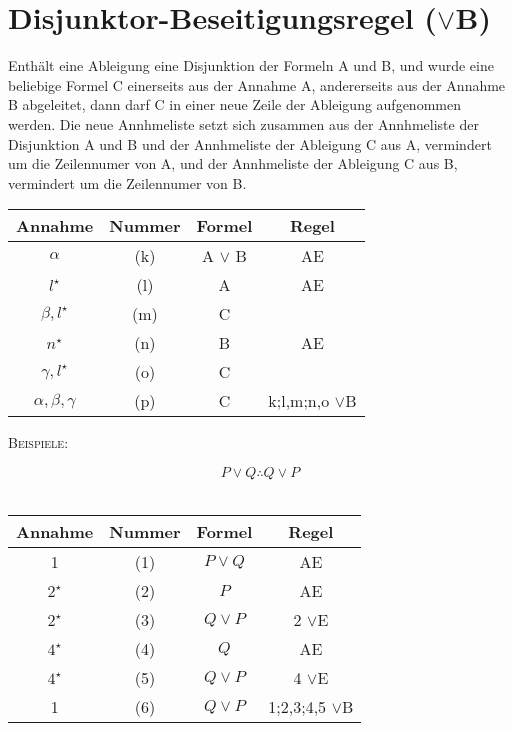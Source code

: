 \documentclass{sajzk}
\begin{document}
\section{Disjunktor-Beseitigungsregel \texorpdfstring{($\lor$B)}{(or B)}}
\label{4sni}
Enthält eine Ableigung eine Disjunktion der Formeln A und B, und wurde eine
beliebige Formel C einerseits aus der Annahme A, andererseits aus der Annahme B
abgeleitet, dann darf C in einer neue Zeile der Ableigung aufgenommen werden.
Die neue Annhmeliste setzt sich zusammen aus der Annhmeliste der Disjunktion A
und B und der Annhmeliste der Ableigung C aus A, vermindert um die Zeilennumer
von A, und der Annhmeliste der Ableigung C aus B, vermindert um die Zeilennumer
von B.

\begin{center}
\begin{tabular}{|c|c|c|c|}
  \hline
  Annahme                  & Nummer & Formel       & Regel \\
  \hline
  $\alpha$                 & (k)    & A $\lor$ B   & AE \\
  \hline
  $l^\star$                & (l)    & A            & AE \\
  \hline
  $\beta, l^\star$         & (m)    & C            & \\
  \hline
  $n^\star$                & (n)    & B            & AE \\
  \hline
  $\gamma, l^\star$        & (o)    & C            & \\
  \hline
  $\alpha, \beta, \gamma$  & (p)    & C            & k;l,m;n,o $\lor$B \\
  \hline
\end{tabular}
\end{center}
\newpage
\textsc{Beispiele:}
\begin{center}
    \[P \lor Q \therefore Q \lor P\] \\
\begin{tabular}{|c|c|c|c|}
  \hline
  Annahme            & Nummer & Formel       & Regel \\
  \hline
  1                  & (1)    & $P \lor Q$   & AE \\
  \hline
  $2^\star$          & (2)    & $P$          & AE \\
  \hline
  $2^\star$          & (3)    & $Q \lor P$    & 2 $\lor$E \\
  \hline
  $4^\star$          & (4)    & $Q$          & AE \\
  \hline
  $4^\star$          & (5)    & $Q \lor P$    & 4 $\lor$E \\
  \hline
  1                  & (6)    & $Q \lor P$   & 1;2,3;4,5 $\lor$B \\
  \hline
\end{tabular}
\end{center}
\end{document}
